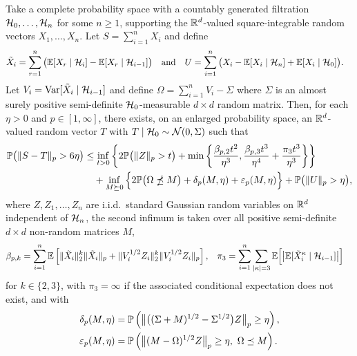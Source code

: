 \begin{theorem}%
  \label{thm:sa_dependent}

  Take a complete probability space with a countably generated
  filtration $\cH_0, \ldots, \cH_n$
  for some $n \geq 1$, supporting the
  $\R^d$-valued square-integrable random vectors
  $X_1, \ldots, X_n$.
  Let $S = \sum_{i=1}^n X_i$ and
  define
  \begin{align*}
    \tilde X_i
    &=
    \sum_{r=1}^n \big(\E[X_{r} \mid \cH_{i}] - \E[X_{r} \mid \cH_{i-1}]\big)
    & &\text{and}
    &U
    &=
    \sum_{i=1}^{n} \big(
      X_i - \E[ X_i \mid \cH_n]
      + \E[ X_i \mid \cH_0 ]
    \big).
  \end{align*}
  Let $V_i = \Var[\tilde X_i \mid \cH_{i-1}]$ and
  define $\Omega = \sum_{i=1}^n V_i - \Sigma$
  where $\Sigma$ is an almost surely positive semi-definite $\cH_0$-measurable
  $d \times d$ random matrix.
  Then, for each $\eta > 0$ and $p \in [1,\infty]$,
  there exists, on an enlarged probability space,
  an $\R^d$-valued random vector $T$ with
  $T \mid \cH_0 \sim \cN(0, \Sigma)$ such that
  \begin{align}
    \label{eq:sa_dependent}
    \P\big(\|S-T\|_p > 6\eta\big)
    &\leq
    \inf_{t>0}
    \left\{
      2 \P\big( \|Z\|_p > t \big)
      + \min\left\{
        \frac{\beta_{p,2} t^2}{\eta^3},
        \frac{\beta_{p,3} t^3}{\eta^4}
        + \frac{\pi_3 t^3}{\eta^3}
      \right\}
    \right\} \nonumber \\
    &\quad+
    \inf_{M \succeq 0}
    \Big\{ 2 \P\big(\Omega \npreceq M\big) + \delta_p(M,\eta)
    + \varepsilon_p(M, \eta)\Big\}
    +\P\big(\|U\|_p>\eta\big),
  \end{align}
  where $Z, Z_1,\dots ,Z_n$ are i.i.d.\ standard Gaussian random variables on
  $\R^d$ independent of $\cH_n$,
  the second infimum is taken over all positive semi-definite
  $d \times d$ non-random matrices $M$,
  \begin{align*}
    \beta_{p,k}
    &=
    \sum_{i=1}^n \E\left[\| \tilde X_i \|^k_2 \| \tilde X_i \|_p
    + \|V_i^{1/2} Z_i \|^k_2 \|V_i^{1/2} Z_i \|_p \right],
    &\pi_3
    &=
    \sum_{i=1}^{n}
    \sum_{|\kappa| = 3}
    \E \Big[ \big|
      \E [ \tilde X_i^\kappa \mid \cH_{i-1} ]
    \big| \Big]
  \end{align*}
  for $k \in \{2, 3\}$, with $\pi_3 = \infty$ if the associated
  conditional expectation does not exist, and with
  \begin{align*}
    \delta_p(M,\eta)
    &=
    \P\left(
      \big\|\big((\Sigma +M)^{1/2}- \Sigma^{1/2}\big) Z\big\|_p
      \geq \eta
    \right), \\
    \varepsilon_p(M, \eta)
    &=
    \P\left(\big\| (M - \Omega)^{1/2} Z \big\|_p\geq \eta, \
    \Omega \preceq M\right).
  \end{align*}
\end{theorem}

